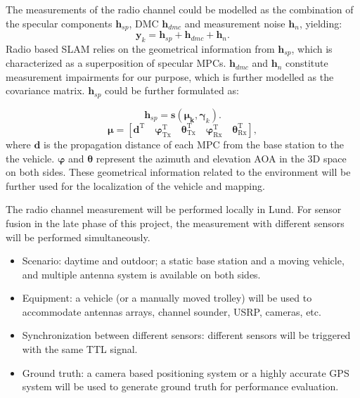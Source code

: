 The measurements of the radio channel could be modelled as the
combination of the specular components $ \mathbf{h}_{sp} $, \gls{DMC}
$ \mathbf{h}_{dmc} $ and measurement noise $
\mathbf{h}_n $, yielding:
\begin{equation}
\mathbf{y}_k = \mathbf{h}_{sp} + \mathbf{h}_{dmc} + \mathbf{h}_n.
\label{eq:channelmodel}
\end{equation}
Radio based SLAM relies on the geometrical information from $
\mathbf{h}_{sp} $, which is characterized as a superposition of
specular \gls{MPC}s. $ \mathbf{h}_{dmc} $ and $ \mathbf{h}_n $
constitute measurement impairments for our purpose, which is further
modelled as the covariance matrix. $ \mathbf{h}_{sp} $ could be
further formulated as:

\begin{equation}
\mathbf{h}_{sp} = \textbf{s}(\mathbf{\boldsymbol{\mu}_k}, \mathbf{\boldsymbol{\gamma}}_k).
\label{eq:channelmodel}
\end{equation}
\begin{equation}
\mathbf{\boldsymbol{\mu}} = [\mathbf{\boldsymbol{d}}^\text{T} \quad  \mathbf{\boldsymbol{\varphi}}^\text{T}_\text{Tx} \quad  \mathbf{\boldsymbol{\theta}}^\text{T}_\text{Tx} \quad \mathbf{\boldsymbol{\varphi}}^\text{T}_\text{Rx} \quad  \mathbf{\boldsymbol{\theta}}^\text{T}_\text{Rx}],
\end{equation}
where $ \mathbf{\boldsymbol{d}} $ is the propagation distance of each
\gls{MPC} from the base station to the the vehicle. $
\mathbf{\boldsymbol{\varphi}} $ and $ \mathbf{\boldsymbol{\theta}} $
represent the azimuth and elevation \gls{AOA} in the 3D space on both
sides. These geometrical information related to the environment will
be further used for the localization of the vehicle and mapping.


The radio channel measurement will be performed locally in Lund. For
sensor fusion in the late phase of this project, the measurement with
different sensors will be performed simultaneously.

\begin{itemize}
\item Scenario: daytime and outdoor; a static base station and a
  moving vehicle, and multiple antenna system is available on both
  sides.
\item Equipment: a vehicle (or a manually moved trolley) will be used
  to accommodate antennas arrays, channel sounder, \gls{USRP},
  cameras, etc.
\item Synchronization between different sensors: different sensors
  will be triggered with the same TTL signal.
\item Ground truth: a camera based positioning system or a highly
  accurate GPS system will be used to generate ground truth for
  performance evaluation.
\end{itemize}

